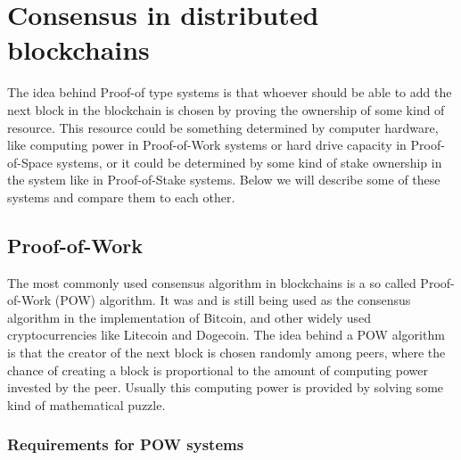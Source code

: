 \section{Consensus in distributed \\ blockchains}

The idea behind Proof-of type systems is that whoever should be able to add the next block in the blockchain is chosen by proving the ownership of some kind of resource. This resource could be
something determined by computer hardware, like computing power in Proof-of-Work systems or hard drive capacity in Proof-of-Space systems, or it could be determined by some kind of stake ownership in
the system like in Proof-of-Stake systems. Below we will describe some of these systems and compare them to each other.

\subsection{Proof-of-Work}

The most commonly used consensus algorithm in blockchains is a so called Proof-of-Work (POW) algorithm. It was and is still being used as the consensus algorithm in the implementation of
Bitcoin,\cite{url:bitcoin} and other widely used cryptocurrencies like Litecoin and Dogecoin. The idea behind a POW algorithm is that the creator of the next block is chosen randomly among peers,
where the chance of creating a block is proportional to the amount of computing power invested by the peer. Usually this computing power is provided by solving some kind of mathematical puzzle.

\subsubsection{Requirements for POW systems}

